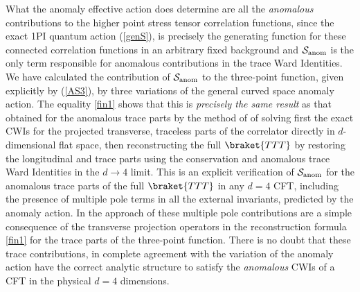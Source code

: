 \documentclass[a4paper,11pt,openright,twoside]{book}
\numberwithin{equation}{section}
\begin{document}
{{What the anomaly effective action does determine are all the {\it anomalous} contributions to the higher point stress tensor
correlation functions, since the exact 1PI quantum action (\ref{genS}), is precisely the generating function for these connected
correlation functions in an arbitrary fixed background and $\mathcal{S}_{\rm anom}$ is the only term responsible for anomalous contributions in the trace Ward Identities. We have calculated the contribution of $\mathcal{S}_{\rm anom}$ to the three-point function, given explicitly by (\ref{AS3}), by three variations of the general curved space anomaly action.
The equality \eqref{fin1} shows that this is {\it precisely the same result} as that obtained for the anomalous trace parts
by the method of \cite{Bzowski:2013sza} of solving first the exact CWIs for the projected transverse, traceless parts of the
correlator directly in $d$-dimensional flat space, then reconstructing the full $\braket{TTT}$ by restoring the longitudinal and trace parts using the conservation and anomalous trace Ward Identities in the $d\rightarrow 4$ limit. This is an explicit verification of $\mathcal{S}_{\rm anom}$ for the anomalous trace parts of the full $\braket{TTT}$ in any $d=4$ CFT, including the presence of multiple pole terms in all the external invariants, predicted by the anomaly action. In the approach of \cite{Bzowski:2013sza} these multiple pole contributions are a simple consequence of the transverse projection operators in the reconstruction formula \eqref{fin1} for the trace parts of the three-point function. There is no doubt that these trace contributions, in complete 
agreement with the variation of the anomaly action have the correct analytic structure to satisfy the {\it anomalous} CWIs of a CFT
in the physical $d=4$ dimensions.

}}
\end{document}
